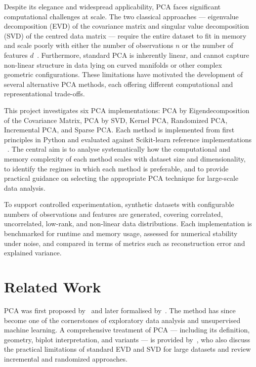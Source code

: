 Despite its elegance and widespread applicability, PCA faces significant computational challenges at scale. The two classical approaches --- eigenvalue decomposition (EVD) of the covariance matrix and singular value decomposition (SVD) of the centred data matrix --- require the entire dataset to fit in memory and scale poorly with either the number of observations $n$ or the number of features $d$~\citep{greenacre_pca_2022}. Furthermore, standard PCA is inherently linear, and cannot capture non-linear structure in data lying on curved manifolds or other complex geometric configurations. These limitations have motivated the development of several alternative PCA methods, each offering different computational and representational trade-offs.
\smallskip 

This project investigates six PCA implementations: PCA by Eigendecomposition of the Covariance Matrix, PCA by SVD, Kernel PCA, Randomized PCA, Incremental PCA, and Sparse PCA. Each method is implemented from first principles in Python and evaluated against Scikit-learn reference implementations ~\citep{pedregosa2011scikit}. The central aim is to analyse systematically how the computational and memory complexity of each method scales with dataset size and dimensionality, to identify the regimes in which each method is preferable, and to provide practical guidance on selecting the appropriate PCA technique for large-scale data analysis.
\smallskip

To support controlled experimentation, synthetic datasets with configurable numbers of observations and features are generated, covering correlated, uncorrelated, low-rank, and non-linear data distributions. Each implementation is benchmarked for runtime and memory usage, assessed for numerical stability under noise, and compared in terms of metrics such as reconstruction error and explained variance.

\section{Related Work}

PCA was first proposed by~\citet{pearson1901} and later formalised by~\citet{hotelling1933}. The method has since become one of the cornerstones of exploratory data analysis and unsupervised machine learning. A comprehensive treatment of PCA --- including its definition, geometry, biplot interpretation, and variants --- is provided by~\citet{greenacre_pca_2022}, who also discuss the practical limitations of standard EVD and SVD for large datasets and review incremental and randomized approaches.
\smallskip

